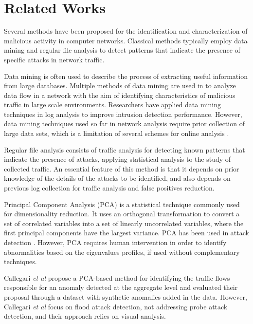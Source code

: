 \section{Related Works}
\label{sec:2_relatedworks}

Several methods have been proposed for the identification and characterization of malicious activity in computer networks. Classical methods typically employ data mining \cite{he2008applying,ghourabi2010data,osanaiye2016distributed} and regular file analysis \cite{raynal2004honeypot} to detect patterns that indicate the presence of specific attacks in network traffic.

Data mining is often used to describe the process of extracting useful information from large databases. Multiple methods of data mining are used in \cite{he2008applying,osanaiye2016distributed} to analyze data flow in a network with the aim of identifying characteristics of malicious traffic in large scale environments. Researchers have applied data mining techniques in log analysis \cite{ghourabi2010data} to improve intrusion detection performance. However, data mining techniques used so far in network analysis require prior collection of large data sets, which is a limitation of several schemes for online analysis \cite{Huang2009}.

Regular file analysis \cite{raynal2004honeypot} consists of traffic analysis for detecting known patterns that indicate the presence of attacks, applying statistical analysis to the study of collected traffic. An essential feature of this method is that it depends on prior knowledge of the details of the attacks to be identified, and also depends on previous log collection for traffic analysis and false positives reduction.

Principal Component Analysis (PCA) is a statistical technique commonly used for dimensionality reduction. It uses an orthogonal transformation to convert a set of correlated variables into a set of linearly uncorrelated variables, where the first principal components have the largest variance. PCA has been used in attack detection \cite{almotairi2009technique}. However, PCA requires human intervention in order to identify abnormalities based on the eigenvalues profiles, if used without complementary techniques.

Callegari \emph{et al} \cite{Zonglin2009} propose a PCA-based method for identifying the traffic flows responsible for an anomaly detected at the aggregate level and evaluated their proposal through a dataset with synthetic anomalies added in the data. However, Callegari \emph{et al} focus on flood attack detection, not addressing probe attack detection, and their approach relies on visual analysis. 

